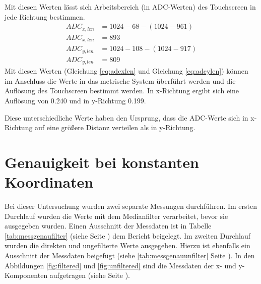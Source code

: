 Mit diesen Werten lässt sich Arbeitsbereich (in ADC-Werten) des Touchscreen in jede Richtung bestimmen.
\begin{align}
    ADC_{x,len} &= 1024 - 68 -(1024-961)\nonumber\\
    ADC_{x,len} &= 893\label{eq:adcxlen}\\
    ADC_{y,len} &= 1024-108-(1024-917)\nonumber\\
    ADC_{y,len} &= 809\label{eq:adcylen}
\end{align}
Mit diesen Werten (Gleichung \ref{eq:adcxlen} und Gleichung \ref{eq:adcylen}) können im Anschluss die Werte in das metrische System überführt werden und die Auflösung des Touchscreen bestimmt werden.
In x-Richtung ergibt sich eine Auflösung von \SI{0,240}{} und in y-Richtung \SI{0,199}{}.

Diese unterschiedliche Werte haben den Ursprung, dass die ADC-Werte sich in x-Richtung auf eine größere Distanz verteilen als in y-Richtung.

\section{Genauigkeit bei konstanten Koordinaten}
\label{ab:genau}
Bei dieser Untersuchung wurden zwei separate Messungen durchführen. Im ersten Durchlauf wurden die Werte mit dem Medianfilter verarbeitet, bevor sie ausgegeben wurden. Einen Ausschnitt der Messdaten ist in Tabelle \ref{tab:messgenaufilter} (siehe Seite \pageref{tab:messgenaufilter}) dem Bericht beigelegt.
Im zweiten Durchlauf wurden die direkten und ungefilterte Werte ausgegeben. Hierzu ist ebenfalls ein Ausschnitt der Messdaten beigefügt (siehe \ref{tab:messgenauunfilter} Seite \pageref{tab:messgenauunfilter}). 
In den Abbildungen \ref{fig:filtered} und \ref{fig:unfiltered} sind die Messdaten der x- und y-Komponenten aufgetragen (siehe Seite \pageref{fig:filtered}).

